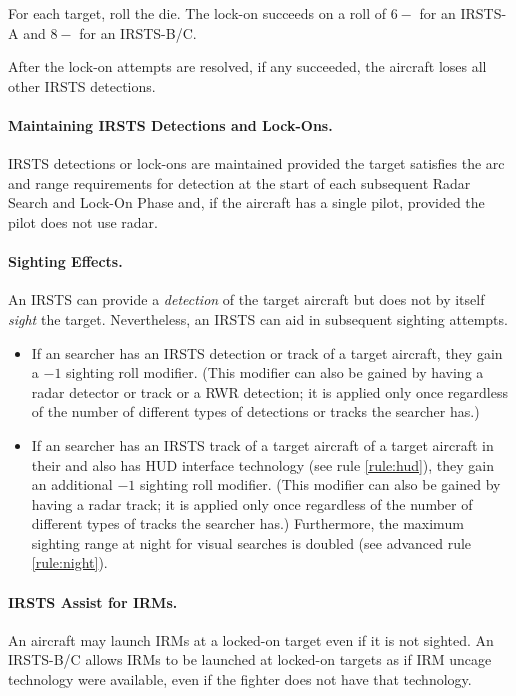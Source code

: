 {\begin{advancedrules}
{For each target, roll the die. The lock-on succeeds on a roll of $6-$ for an IRSTS-A and $8-$ for an IRSTS-B/C. 

After the lock-on attempts are resolved, if any succeeded, the aircraft loses all other IRSTS detections.

\paragraph{Maintaining IRSTS Detections and Lock-Ons.} IRSTS detections or lock-ons are maintained provided the target satisfies the arc and range requirements for detection at the start of each subsequent Radar Search and Lock-On Phase and, if the aircraft has a single pilot, provided the pilot does not use radar.

\paragraph{Sighting Effects.}
An IRSTS can provide a \emph{detection} of the target aircraft but does not by itself \emph{sight} the target. Nevertheless, an IRSTS can aid in subsequent sighting attempts. 

\begin{itemize}
\item If an searcher has an IRSTS detection or track of a target aircraft, they gain a $-1$ sighting roll modifier. (This modifier can also be gained by having a radar detector or track or a RWR detection; it is applied only once regardless of the number of different types of detections or tracks the searcher has.)
\item
If an searcher has an IRSTS track of a target aircraft of a target aircraft in their   and also has HUD interface technology (see rule \ref{rule:hud}), they gain an additional $-1$ sighting roll modifier.  (This modifier can also be gained by having a radar track; it is applied only once regardless of the number of different types of tracks the searcher has.) Furthermore, the maximum sighting range at night for visual searches is doubled (see advanced rule \ref{rule:night}).
\end{itemize}

\paragraph{IRSTS Assist for IRMs.} An aircraft may launch IRMs at a locked-on target even if it is not sighted. An IRSTS-B/C allows IRMs to be launched at locked-on targets as if IRM uncage technology were available, even if the fighter does not have that technology.

}

\end{advancedrules}

}

